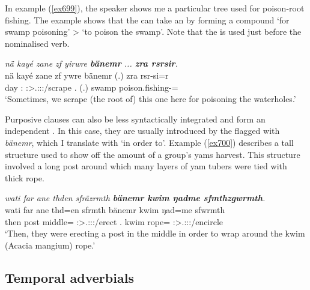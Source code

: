 In example (\ref{ex699}), the speaker shows me a particular tree used for poison-root fishing. The example shows that the   can take an  by forming a compound `for swamp poisoning' > `to poison the swamp'. Note that the   is used just before the nominalised verb.

\begin{exe}
	\ex \emph{nä kayé zane zf yirwre \textbf{bänemr} ... \textbf{zra rsrsir}.}\\
	\gll nä kayé zane zf ywre bänemr (.) zra rsr-si=r\\
	{\Indf} day \Dem:{\Prox} {\Imm} \Fpl:\Sbj>\Tsg.\Masc:\Obj:\Nonpast:\Ipfv/scrape \Recog.{\Purp} (.) swamp poison.fishing-\Nmlz=\Purp\\
	\trans `Sometimes, we scrape (the root of) this one here for poisoning the waterholes.'\\
	\label{ex699}
\end{exe}

Purposive clauses can also be less syntactically integrated and form an independent . In this case, they are usually introduced by the  flagged with   \emph{bänemr}, which I translate with `in order to'. Example (\ref{ex700}) describes a tall structure used to show off the amount of a group's yams harvest. This structure involved a long post around which many layers of yam tubers were tied with thick rope.

\begin{exe}
	\ex \emph{wati far ane thden sfräzrmth \textbf{bänemr kwim ŋadme sfmthzgwrmth}.}\\
	\gll wati far ane thd=en sfrmth bänemr kwim ŋad=me sfwrmth\\
	then post {\Dem} middle={\Loc} \Stpl:\Sbj>\Tsg.\Masc:\Obj:\Pst:\Dur/erect \Recog.{\Purp} kwim rope={\Ins} \Stpl:\Sbj>\Tsg.\Masc:\Obj:\Pst:\Dur/encircle\\
	\trans `Then, they were erecting a post in the middle in order to wrap around the kwim (Acacia mangium) rope.'
	\label{ex700}
\end{exe}

\subsection{Temporal adverbials}\label{tempadverbials}

